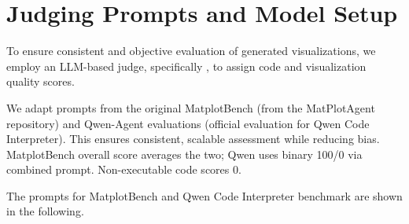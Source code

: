 \section{Judging Prompts and Model Setup}\label{appendix:eval-prompts}

To ensure consistent and objective evaluation of generated visualizations, we employ an LLM-based judge, specifically , to assign code and visualization quality scores. 

We adapt prompts from the original MatplotBench (from the MatPlotAgent repository) and Qwen-Agent evaluations (official evaluation for Qwen Code Interpreter). This ensures consistent, scalable assessment while reducing bias.
MatplotBench overall score averages the two; Qwen uses binary 100/0 via combined prompt. Non-executable code scores 0.

The prompts for MatplotBench and Qwen Code Interpreter benchmark are shown in the following.




